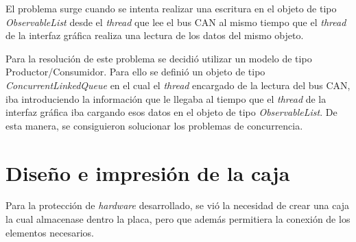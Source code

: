 El problema surge cuando se intenta realizar una escritura en el objeto de tipo \emph{ObservableList} desde el \emph{thread} que lee el bus CAN al mismo tiempo que el \emph{thread} de la interfaz gráfica realiza una lectura de los datos del mismo objeto.

Para la resolución de este problema se decidió utilizar un modelo de tipo Productor/Consumidor. Para ello se definió un objeto de tipo \emph{ConcurrentLinkedQueue} en el cual el \emph{thread} encargado de la lectura del bus CAN, iba introduciendo la información que le llegaba al tiempo que el \emph{thread} de la interfaz gráfica iba cargando esos datos en el objeto de tipo \emph{ObservableList}. De esta manera, se consiguieron solucionar los problemas de concurrencia.

\section{Diseño e impresión de la caja}\label{desarrollo_e_impresion_de_la_caja}

Para la protección de \emph{hardware} desarrollado, se vió la necesidad de crear una caja la cual almacenase dentro la placa, pero que además permitiera la conexión de los elementos necesarios.



